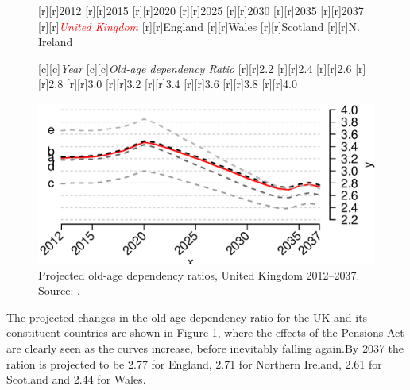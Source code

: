 \documentclass[11 pt, a4paper]{report}
\begin{document}
\begin{figure}[hbtp!]
[r][r]{\small{2012}}
[r][r]{\small{2015}}
[r][r]{\small{2020}}
[r][r]{\small{2025}}
[r][r]{\small{2030}}
[r][r]{\small{2035}}
[r][r]{\small{2037}}
[r][r]{\small{\emph{\textcolor{red}{United Kingdom}}}}
[r][r]{\small{England}}
[r][r]{\small{Wales}}
[r][r]{\small{Scotland}}
[r][r]{\small{N. Ireland}}

[c][c]{\small{\emph{Year}}}
[c][c]{\small{\emph{Old-age dependency Ratio}}}
[r][r]{\small{2.2}}
[r][r]{\small{2.4}}
[r][r]{\small{2.6}}
[r][r]{\small{2.8}}
[r][r]{\small{3.0}}
[r][r]{\small{3.2}}
[r][r]{\small{3.4}}
[r][r]{\small{3.6}}
[r][r]{\small{3.8}}
[r][r]{\small{4.0}}

\includegraphics[width=\textwidth]{../figures/Fig4.4.eps}
\caption{Projected old-age dependency ratios, United Kingdom 2012--2037. Source: \citet{ONS2014b}.}
\label{Fig:15}
\end{figure}

The projected changes in the old age-dependency ratio for the UK and its constituent countries are shown in Figure \ref{Fig:15}, where the effects of the Pensions Act are clearly seen as the curves increase, before inevitably falling again.By 2037 the ration is projected to be 2.77 for England, 2.71 for Northern Ireland, 2.61 for Scotland and 2.44 for Wales.
\end{document}
